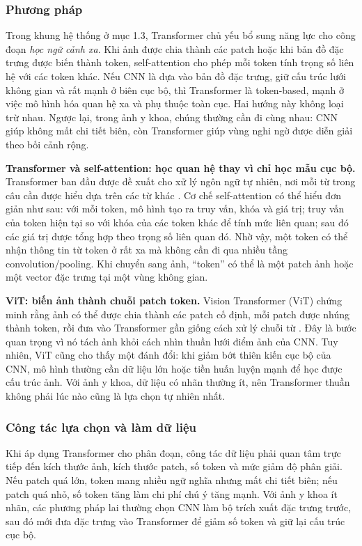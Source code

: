 \subsubsection{Phương pháp}

Trong khung hệ thống ở mục 1.3, Transformer chủ yếu bổ sung năng lực cho công đoạn \textit{học ngữ cảnh xa}. Khi ảnh được chia thành các patch hoặc khi bản đồ đặc trưng được biến thành token, self-attention cho phép mỗi token tính trọng số liên hệ với các token khác. Nếu CNN là dựa vào bản đồ đặc trưng, giữ cấu trúc lưới không gian và rất mạnh ở biên cục bộ, thì Transformer là token-based, mạnh ở việc mô hình hóa quan hệ xa và phụ thuộc toàn cục. Hai hướng này không loại trừ nhau. Ngược lại, trong ảnh y khoa, chúng thường cần đi cùng nhau: CNN giúp không mất chi tiết biên, còn Transformer giúp vùng nghi ngờ được diễn giải theo bối cảnh rộng.

\textbf{Transformer và self-attention: học quan hệ thay vì chỉ học mẫu cục bộ.} Transformer ban đầu được đề xuất cho xử lý ngôn ngữ tự nhiên, nơi mỗi từ trong câu cần được hiểu dựa trên các từ khác \cite{vaswani2017attention}. Cơ chế self-attention có thể hiểu đơn giản như sau: với mỗi token, mô hình tạo ra truy vấn, khóa và giá trị; truy vấn của token hiện tại so với khóa của các token khác để tính mức liên quan; sau đó các giá trị được tổng hợp theo trọng số liên quan đó. Nhờ vậy, một token có thể nhận thông tin từ token ở rất xa mà không cần đi qua nhiều tầng convolution/pooling. Khi chuyển sang ảnh, ``token'' có thể là một patch ảnh hoặc một vector đặc trưng tại một vùng không gian.

\textbf{ViT: biến ảnh thành chuỗi patch token.} Vision Transformer (ViT) chứng minh rằng ảnh có thể được chia thành các patch cố định, mỗi patch được nhúng thành token, rồi đưa vào Transformer gần giống cách xử lý chuỗi từ \cite{dosovitskiy2020vit}. Đây là bước quan trọng vì nó tách ảnh khỏi cách nhìn thuần lưới điểm ảnh của CNN. Tuy nhiên, ViT cũng cho thấy một đánh đổi: khi giảm bớt thiên kiến cục bộ của CNN, mô hình thường cần dữ liệu lớn hoặc tiền huấn luyện mạnh để học được cấu trúc ảnh. Với ảnh y khoa, dữ liệu có nhãn thường ít, nên Transformer thuần không phải lúc nào cũng là lựa chọn tự nhiên nhất.

\subsubsection{Công tác lựa chọn và làm dữ liệu}

Khi áp dụng Transformer cho phân đoạn, công tác dữ liệu phải quan tâm trực tiếp đến kích thước ảnh, kích thước patch, số token và mức giảm độ phân giải. Nếu patch quá lớn, token mang nhiều ngữ nghĩa nhưng mất chi tiết biên; nếu patch quá nhỏ, số token tăng làm chi phí chú ý tăng mạnh. Với ảnh y khoa ít nhãn, các phương pháp lai thường chọn CNN làm bộ trích xuất đặc trưng trước, sau đó mới đưa đặc trưng vào Transformer để giảm số token và giữ lại cấu trúc cục bộ.


